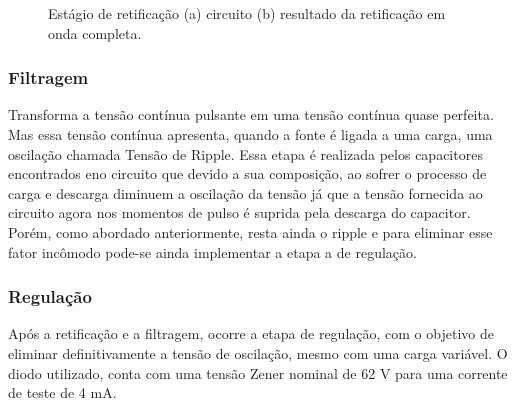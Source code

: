 \documentclass[a4paper,12pt,oneside,openany,table,xcdraw]{article}
\begin{document}
\begin{figure}[H]
\centering
{}\hfill
{}
\caption{Estágio de retificação (a) circuito (b) resultado da retificação em onda completa.}
\label{fonte:retificacao}
\end{figure}

\vspace{0.2cm}
\subsubsection{Filtragem}
Transforma a tensão contínua pulsante em uma tensão contínua quase perfeita. Mas essa tensão contínua apresenta, quando a fonte é ligada a uma carga, uma oscilação chamada Tensão de Ripple. Essa etapa é realizada pelos capacitores encontrados eno circuito que devido a sua composição, ao sofrer o processo de carga e descarga diminuem a oscilação da tensão já que a tensão fornecida ao circuito agora nos momentos de pulso é suprida pela descarga do capacitor. Porém, como abordado anteriormente, resta ainda o ripple e para eliminar esse fator incômodo pode-se ainda implementar a etapa a de regulação.

\vspace{0.2cm}
\subsubsection{Regulação}
Após a retificação e a filtragem, ocorre a etapa de regulação, com o objetivo de eliminar definitivamente a tensão de oscilação, mesmo com uma carga variável. O diodo utilizado, conta com uma tensão Zener nominal de 62 V para uma corrente de teste de 4 mA.
\end{document}
